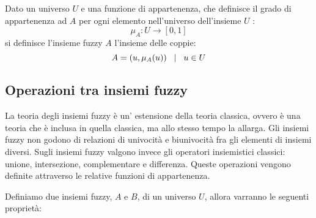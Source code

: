 \documentclass[a4paper,12pt]{report}
\begin{document}
Dato un universo $U$ e una funzione di appartenenza, che definisce il grado di appartenenza ad $A$ per ogni elemento nell'universo dell'insieme $U$ :
\begin{equation*}
    \mu_A : U \to [0,1]
\end{equation*}
si definisce l'insieme fuzzy $A$ l'insieme delle coppie:
\begin{equation*}
    A = {(u, \mu_A(u)) \hspace{0,3cm} | \hspace{0,3cm} u\in U}
\end{equation*}


\subsection*{Operazioni tra insiemi fuzzy}
La teoria degli insiemi fuzzy è un' estensione della teoria classica, ovvero è una teoria che è inclusa in quella classica, ma allo stesso tempo la allarga. 
Gli insiemi fuzzy non godono di relazioni di univocità e biunivocità fra gli elementi di insiemi diversi.
Sugli insiemi fuzzy valgono invece gli operatori insiemistici classici: unione, intersezione, complementare e differenza.
Queste operazioni vengono definite attraverso le relative funzioni di appartenenza.

\bigskip

Definiamo due insiemi fuzzy, $A$ e $B$, di un universo $U$, allora varranno le seguenti proprietà:
\end{document}
